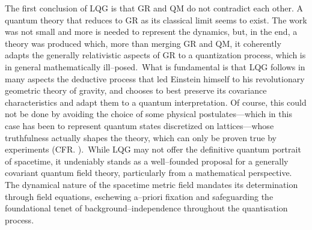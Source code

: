 The first conclusion of LQG is that GR and QM do not contradict each other. A quantum theory that reduces to GR as its classical limit seems to exist. The work was not small and more is needed to represent the dynamics, but, in the end, a theory was produced which, more than merging GR and QM, it coherently adapts the generally relativistic aspects of GR to a quantization process, which is in general mathematically ill--posed.\, What is fundamental is that LQG follows in many aspects the deductive process that led Einstein himself to his revolutionary geometric theory of gravity, and chooses to best preserve its covariance characteristics and adapt them to a quantum interpretation. Of course, this could not be done by avoiding the choice of some physical postulates---which in this case has been to represent quantum states discretized on lattices---whose truthfulness actually shapes the theory, which can only be proven true by experiments (CFR. \cite{baggot}).\, While LQG may not offer the definitive quantum portrait of spacetime, it undeniably stands as a well--founded proposal for a generally covariant quantum field theory, particularly from a mathematical perspective. The dynamical nature of the spacetime metric field mandates its determination through field equations, eschewing a--priori fixation and safeguarding the foundational tenet of background--independence throughout the quantisation process. %

